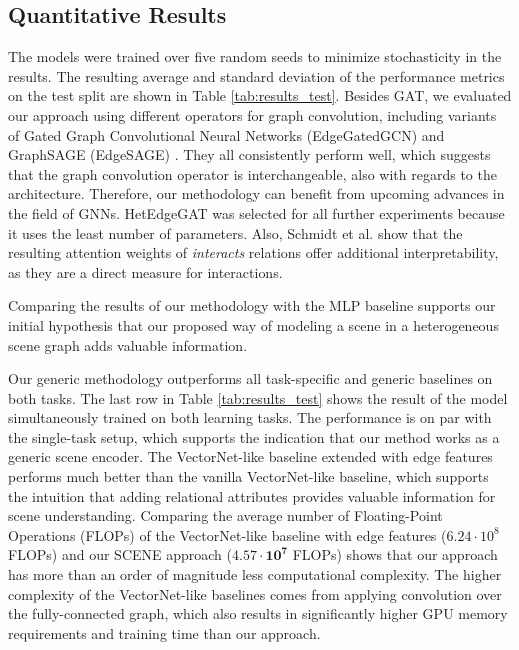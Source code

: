 \documentclass[letterpaper, 10 pt, journal, twoside]{IEEEtran}
\begin{document}
\subsection{Quantitative Results}
The models were trained over five random seeds to minimize stochasticity in the results.
The resulting average and standard deviation of the performance metrics on the test split are shown in Table \ref{tab:results_test}.
Besides GAT, we evaluated our approach using different operators for graph convolution, including variants of Gated Graph Convolutional Neural Networks (EdgeGatedGCN) \cite{Bresson2018_ARXIV} and GraphSAGE (EdgeSAGE) \cite{Hamilton2017}.
They all consistently perform well, which suggests that the graph convolution operator is interchangeable, also with regards to the architecture.
Therefore, our methodology can benefit from upcoming advances in the field of GNNs.
HetEdgeGAT was selected for all further experiments because it uses the least number of parameters.
Also, Schmidt et al. \cite{Schmidt2022} show that the resulting attention weights of \textit{interacts} relations offer additional interpretability, as they are a direct measure for interactions.

Comparing the results of our methodology with the MLP baseline supports our initial hypothesis that our proposed way of modeling a scene in a heterogeneous scene graph adds valuable information.

Our generic methodology outperforms all task-specific and generic baselines on both tasks.
The last row in Table \ref{tab:results_test} shows the result of the model simultaneously trained on both learning tasks.
The performance is on par with the single-task setup, which supports the indication that our method works as a generic scene encoder.
The VectorNet-like baseline extended with edge features performs much better than the vanilla VectorNet-like baseline, which supports the intuition that adding relational attributes provides valuable information for scene understanding.
Comparing the average number of Floating-Point Operations (FLOPs) of the VectorNet-like baseline with edge features ($6.24\cdot10^8$ FLOPs) and our SCENE approach ($\mathbf{4.57\cdot10^7}$ FLOPs) shows that our approach has more than an order of magnitude less computational complexity.
The higher complexity of the VectorNet-like baselines comes from applying convolution over the fully-connected graph, which also results in significantly higher GPU memory requirements and training time than our approach.
\end{document}
